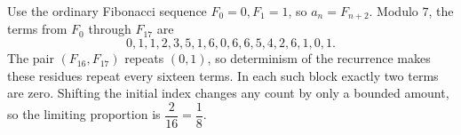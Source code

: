 Use the ordinary Fibonacci sequence $ F_0=0,F_1=1 $, so $ a_n=F_{n+2}$. Modulo $ 7 $, the terms from $ F_0 $ through $ F_{17}$ are \[0,1,1,2,3,5,1,6,0,6,6,5,4,2,6,1,0,1.\]The pair $(F_{16},F_{17})$ repeats $(0,1)$, so determinism of the recurrence makes these residues repeat every sixteen terms. In each such block exactly two terms are zero. Shifting the initial index changes any count by only a bounded amount, so the limiting proportion is $\boxed{\dfrac{2}{16}=\dfrac{1}{8}}$.
